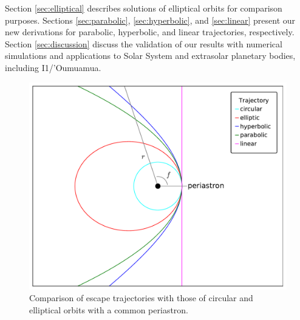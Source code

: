 \documentclass[a4paper,fleqn,usenatbib]{mnras}
\begin{document}
Section \ref{sec:elliptical} describes solutions of elliptical orbits for comparison purposes. Sections \ref{sec:parabolic}, \ref{sec:hyperbolic}, and \ref{sec:linear} present our new derivations for parabolic, hyperbolic, and linear trajectories, respectively. Section \ref{sec:discussion} discuss the validation of our results with numerical simulations and applications to Solar System and extrasolar planetary bodies, including I1/'Oumuamua.

\begin{figure}
\includegraphics[width=\columnwidth]{f1.pdf}
\caption{Comparison of escape trajectories with those of circular and elliptical orbits with a common periastron.}
\label{fig1}
\end{figure}
\end{document}
